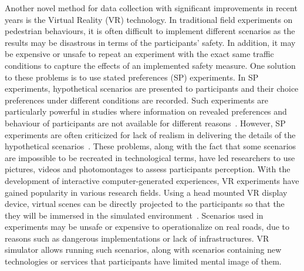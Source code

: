 Another novel method for data collection with significant improvements in recent years is the Virtual Reality (VR) technology. In traditional field experiments on pedestrian behaviours, it is often difficult to implement different scenarios as the results may be disastrous in terms of the participants’ safety. In addition, it may be expensive or unsafe to repeat an experiment with the exact same traffic conditions to capture the effects of an implemented safety measure. One solution to these problems is to use stated preferences (SP) experiments. In SP experiments, hypothetical scenarios are presented to participants and their choice preferences under different conditions are recorded. Such experiments are particularly powerful in studies where information on revealed preferences and behaviour of participants are not available for different reasons~\cite{cherchi2015workshop}. However, SP experiments are often criticized for lack of realism in delivering the details of the hypothetical scenarios~\cite{farooq2018virtual}. These problems, along with the fact that some scenarios are impossible to be recreated in technological terms, have led researchers to use pictures, videos and photomontages to assess participants perception. With the development of interactive computer-generated experiences, VR experiments have gained popularity in various research fields. Using a head mounted VR display device, virtual scenes can be directly projected to the participants so that the they will be immersed in the simulated environment~\cite{farooq2018virtual}. Scenarios used in experiments may be unsafe or expensive to operationalize on real roads, due to reasons such as dangerous implementations or lack of infrastructures. VR simulator allows running such scenarios, along with scenarios containing new technologies or services that participants have limited mental image of them. 

